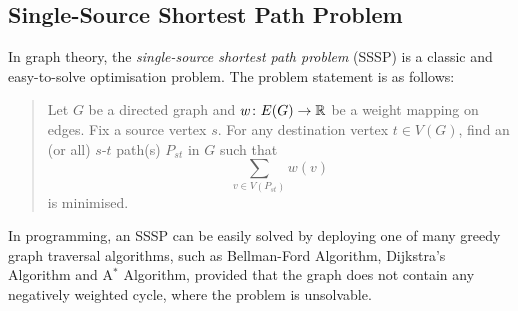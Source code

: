\documentclass[math, code]{amznotes}
\theoremstyle{remark}
\begin{document}
\subsection{Single-Source Shortest Path Problem}
In graph theory, the \textit{single-source shortest path problem} (SSSP) is a classic and easy-to-solve optimisation problem. The problem statement is as follows:
\begin{quote}
    Let $G$ be a directed graph and $w \colon E(G) \to \mathbb{R}$ be a weight mapping on edges. Fix a source vertex $s$. For any destination vertex $t \in V(G)$, find an (or all) $s$-$t$ path(s) $P_{st}$ in $G$ such that 
    \begin{equation*}
        \sum_{v \in V(P_{st})}w(v)
    \end{equation*}
    is minimised.
\end{quote}
In programming, an SSSP can be easily solved by deploying one of many greedy graph traversal algorithms, such as Bellman-Ford Algorithm, Dijkstra's Algorithm and A$^*$ Algorithm, provided that the graph does not contain any negatively weighted cycle, where the problem is unsolvable.
\end{document}
